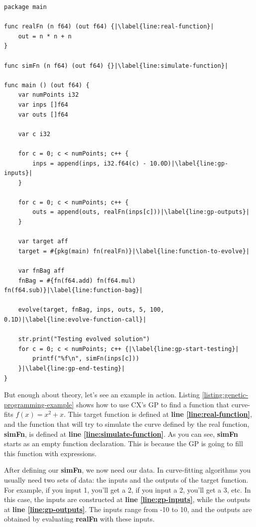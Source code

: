 \documentclass[11pt,fleqn,openany]{book} %
\begin{document}
\begin{lstlisting}[caption={Using genetic programming to evolve a function},captionpos=b,label={listing:genetic-programming-example}]
package main

func realFn (n f64) (out f64) {|\label{line:real-function}|
    out = n * n + n
}

func simFn (n f64) (out f64) {}|\label{line:simulate-function}|

func main () (out f64) {
	var numPoints i32
    var inps []f64
    var outs []f64
    
    var c i32
    
	for c = 0; c < numPoints; c++ {
        inps = append(inps, i32.f64(c) - 10.0D)|\label{line:gp-inputs}|
	}

	for c = 0; c < numPoints; c++ {
        outs = append(outs, realFn(inps[c]))|\label{line:gp-outputs}|
	}
	
    var target aff
    target = #{pkg(main) fn(realFn)}|\label{line:function-to-evolve}|
    
    var fnBag aff
    fnBag = #{fn(f64.add) fn(f64.mul) fn(f64.sub)}|\label{line:function-bag}|
    
	evolve(target, fnBag, inps, outs, 5, 100, 0.1D)|\label{line:evolve-function-call}|

	str.print("Testing evolved solution")
	for c = 0; c < numPoints; c++ {|\label{line:gp-start-testing}|
        printf("%f\n", simFn(inps[c]))
	}|\label{line:gp-end-testing}|
}
\end{lstlisting}

But enough about theory, let's see an example in action. Listing \ref{listing:genetic-programming-example} shows how to use CX's GP to find a function that curve-fits $f(x) = x^2 + x$. This target function is defined at \textbf{line \ref{line:real-function}}, and the function that will try to simulate the curve defined by the real function, \textbf{simFn}, is defined at \textbf{line \ref{line:simulate-function}}. As you can see, \textbf{simFn} starts as an empty function declaration. This is because the GP is going to fill this function with expressions.

After defining our \textbf{simFn}, we now need our data. In curve-fitting algorithms you usually need two sets of data: the inputs and the outputs of the target function. For example, if you input 1, you'll get a 2, if you input a 2, you'll get a 3, etc. In this case, the inputs are constructed at \textbf{line \ref{line:gp-inputs}}, while the outputs at \textbf{line \ref{line:gp-outputs}}. The inputs range from -10 to 10, and the outputs are obtained by evaluating \textbf{realFn} with these inputs.
\end{document}

